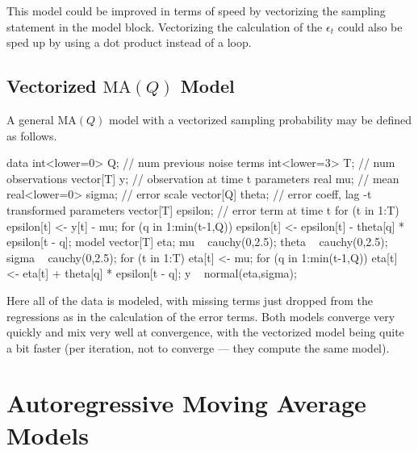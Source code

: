 This model could be improved in terms of speed by vectorizing the
sampling statement in the model block.  Vectorizing the calculation of
the $\epsilon_t$ could also be sped up by using a dot product instead
of a loop.  


\subsection{Vectorized $\mbox{MA}(Q)$ Model}

A general $\mbox{MA}(Q)$ model with a vectorized sampling probability
may be defined as follows.
%
\begin{stancode}
data {
  int<lower=0> Q;  // num previous noise terms
  int<lower=3> T;  // num observations
  vector[T] y;     // observation at time t
}
parameters {
  real mu;              // mean
  real<lower=0> sigma;  // error scale
  vector[Q] theta;      // error coeff, lag -t
}
transformed parameters {
  vector[T] epsilon;    // error term at time t
  for (t in 1:T) {
    epsilon[t] <- y[t] - mu;
    for (q in 1:min(t-1,Q))
      epsilon[t] <- epsilon[t] - theta[q] * epsilon[t - q];
  }
}
model {
  vector[T] eta;
  mu ~ cauchy(0,2.5);
  theta ~ cauchy(0,2.5);
  sigma ~ cauchy(0,2.5);
  for (t in 1:T) {
    eta[t] <- mu;
    for (q in 1:min(t-1,Q))
      eta[t] <- eta[t] + theta[q] * epsilon[t - q];
  }
  y ~ normal(eta,sigma);
}
\end{stancode}
%
Here all of the data is modeled, with missing terms just dropped from
the regressions as in the calculation of the error terms.  Both models
converge very quickly and mix very well at convergence, with the
vectorized model being quite a bit faster (per iteration, not to
converge --- they compute the same model).


\section{Autoregressive Moving Average Models}

